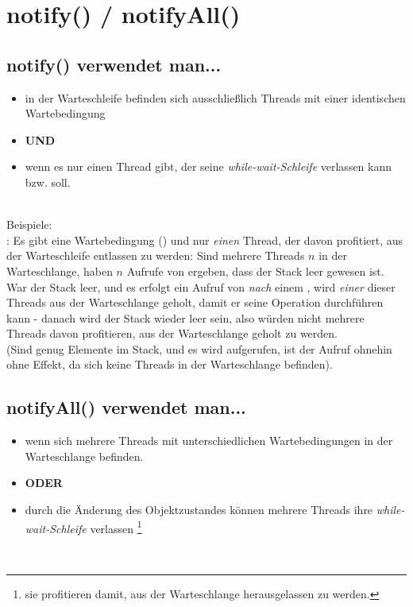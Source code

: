 \section{notify() / notifyAll()}

\subsection*{notify() verwendet man...}
\begin{itemize}
    \item in der Warteschleife befinden sich ausschließlich Threads mit einer identischen Wartebedingung
    \item[] \textbf{UND}
    \item wenn es nur einen Thread gibt, der seine \textit{while-wait-Schleife} verlassen kann bzw. soll.
\end{itemize}\\

\noindent
Beispiele:\\

\noindent
{}: Es gibt eine Wartebedingung () und nur \textit{einen} Thread, der davon profitiert, aus der Warteschleife entlassen zu werden: Sind mehrere Threads $n$ in der Warteschlange,  haben $n$ Aufrufe von  ergeben, dass der Stack leer gewesen ist.\\
War der Stack leer, und es erfolgt ein Aufruf von  \textit{nach} einem , wird \textit{einer} dieser Threads aus der Warteschlange geholt, damit er seine Operation durchführen kann - danach wird der Stack wieder leer sein, also würden nicht mehrere Threads davon profitieren, aus der Warteschlange geholt zu werden.\\
(Sind genug Elemente im Stack, und es wird  aufgerufen, ist der Aufruf ohnehin ohne Effekt, da sich keine Threads in der Warteschlange befinden).

\subsection*{notifyAll() verwendet man...}
\begin{itemize}
    \item wenn sich mehrere Threads mit unterschiedlichen Wartebedingungen in der Warteschlange befinden.
    \item[] \textbf{ODER}
    \item durch die Änderung des Objektzustandes können mehrere Threads ihre \textit{while-wait-Schleife} verlassen \footnote{
     sie profitieren damit, aus der Warteschlange herausgelassen zu werden.
    }
\end{itemize}\\


